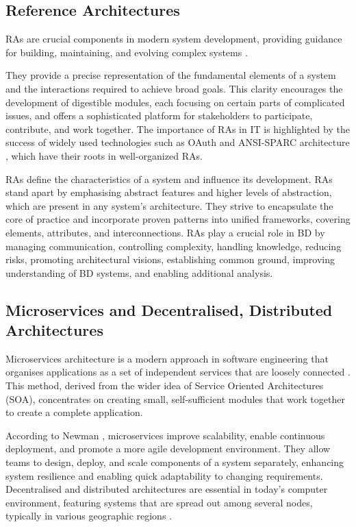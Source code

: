 \documentclass{ieeeaccess}
\begin{document}
\subsection{Reference Architectures} 

RAs are crucial components in modern system development, providing guidance for building, maintaining, and evolving complex systems \cite{Cloutier2010}. 

They provide a precise representation of the fundamental elements of a system and the interactions required to achieve broad goals. This clarity encourages the development of digestible modules, each focusing on certain parts of complicated issues, and offers a sophisticated platform for stakeholders to participate, contribute, and work together. The importance of RAs in IT is highlighted by the success of widely used technologies such as OAuth \cite{OATH} and ANSI-SPARC architecture \cite{ANSI}, which have their roots in well-organized RAs. 

RAs define the characteristics of a system and influence its development. RAs stand apart by emphasising abstract features and higher levels of abstraction, which are present in any system's architecture. They strive to encapsulate the core of practice and incorporate proven patterns into unified frameworks, covering elements, attributes, and interconnections. RAs play a crucial role in BD by managing communication, controlling complexity, handling knowledge, reducing risks, promoting architectural visions, establishing common ground, improving understanding of BD systems, and enabling additional analysis. 

\subsection{Microservices and Decentralised, Distributed Architectures} 

Microservices architecture is a modern approach in software engineering that organises applications as a set of independent services that are loosely connected \cite{bucchiarone2020microservices}. This method, derived from the wider idea of Service Oriented Architectures (SOA), concentrates on creating small, self-sufficient modules that work together to create a complete application. 

According to Newman \cite{newman2021building}, microservices improve scalability, enable continuous deployment, and promote a more agile development environment. They allow teams to design, deploy, and scale components of a system separately, enhancing system resilience and enabling quick adaptability to changing requirements. Decentralised and distributed architectures are essential in today's computer environment, featuring systems that are spread out among several nodes, typically in various geographic regions \cite{ataei2023application}. 
\end{document}
